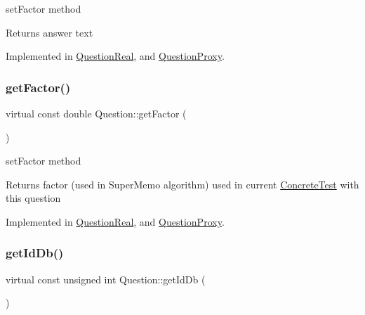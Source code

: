set\+Factor method 

\begin{DoxyReturn}{Returns}
answer text 
\end{DoxyReturn}


Implemented in \hyperlink{class_question_real_aa77cc2b576c35927d17af97f00ccf116}{Question\+Real}, and \hyperlink{class_question_proxy_aaea03e52cf7e3f9d19d59134e88d6df0}{Question\+Proxy}.

\mbox{\label{class_question_a31d98a74f4e54916d11bc2817b5518a4}} 
\subsubsection{\texorpdfstring{get\+Factor()}{getFactor()}}
{\footnotesize\ttfamily virtual const double Question\+::get\+Factor (\begin{DoxyParamCaption}{ }\end{DoxyParamCaption})\hspace{0.3cm}{\ttfamily [pure virtual]}}



set\+Factor method 

\begin{DoxyReturn}{Returns}
factor (used in Super\+Memo algorithm) used in current \hyperlink{class_concrete_test}{Concrete\+Test} with this question 
\end{DoxyReturn}


Implemented in \hyperlink{class_question_real_a85fa2fc7e14e9017e9dd9329aeb331ff}{Question\+Real}, and \hyperlink{class_question_proxy_af3eeb645cbd04fe05418e5931e55585e}{Question\+Proxy}.

\mbox{\label{class_question_a5253480b740d35dfb7fe1331d74457b3}} 
\subsubsection{\texorpdfstring{get\+Id\+Db()}{getIdDb()}}
{\footnotesize\ttfamily virtual const unsigned int Question\+::get\+Id\+Db (\begin{DoxyParamCaption}{ }\end{DoxyParamCaption})\hspace{0.3cm}{\ttfamily [pure virtual]}}



